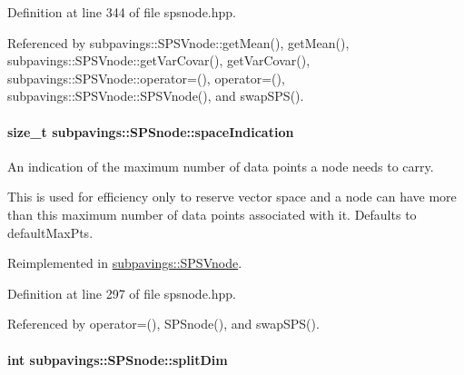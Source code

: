 \-Definition at line 344 of file spsnode.\-hpp.



\-Referenced by subpavings\-::\-S\-P\-S\-Vnode\-::get\-Mean(), get\-Mean(), subpavings\-::\-S\-P\-S\-Vnode\-::get\-Var\-Covar(), get\-Var\-Covar(), subpavings\-::\-S\-P\-S\-Vnode\-::operator=(), operator=(), subpavings\-::\-S\-P\-S\-Vnode\-::\-S\-P\-S\-Vnode(), and swap\-S\-P\-S().

\hypertarget{classsubpavings_1_1SPSnode_a4d836fd2b3cd074343475de6f9511c95}{
\paragraph[{space\-Indication}]{\setlength{\rightskip}{0pt plus 5cm}size\-\_\-t {\bf subpavings\-::\-S\-P\-Snode\-::space\-Indication}}}\label{classsubpavings_1_1SPSnode_a4d836fd2b3cd074343475de6f9511c95}


\-An indication of the maximum number of data points a node needs to carry. 

\-This is used for efficiency only to reserve vector space and a node can have more than this maximum number of data points associated with it. \-Defaults to default\-Max\-Pts. 

\-Reimplemented in \hyperlink{classsubpavings_1_1SPSVnode_a98a73d1c8dafe1d9248aeec76c8f74ef}{subpavings\-::\-S\-P\-S\-Vnode}.



\-Definition at line 297 of file spsnode.\-hpp.



\-Referenced by operator=(), \-S\-P\-Snode(), and swap\-S\-P\-S().

\hypertarget{classsubpavings_1_1SPSnode_afbda0af3b68cf12874faa64aa8a9b154}{
\paragraph[{split\-Dim}]{\setlength{\rightskip}{0pt plus 5cm}int {\bf subpavings\-::\-S\-P\-Snode\-::split\-Dim}}}\label{classsubpavings_1_1SPSnode_afbda0af3b68cf12874faa64aa8a9b154}


